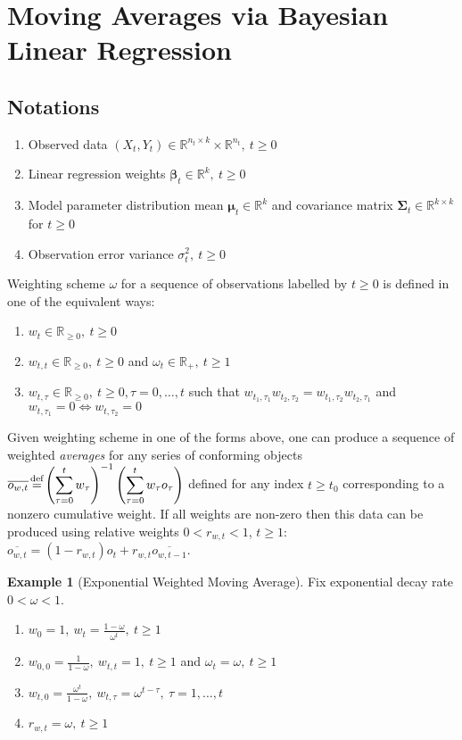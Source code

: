 \documentclass[10pt,fleqn]{amsart}
\theoremstyle{definition}
\newtheorem{example}[theorem]{Example}
\theoremstyle{remark}
\numberwithin{equation}{section}
\newcommand{\RR}{\mathbb{R}}
\newcommand{\eq}{\stackrel{\mathclap{\normalfont\text{def}}}{=}}
\newcommand{\bbeta}{\boldsymbol{\beta}}
\newcommand{\mmu}{\boldsymbol{\mu}}
\newcommand{\SSigma}{\boldsymbol{\Sigma}}
\begin{document}
\section{Moving Averages via Bayesian Linear Regression}
\subsection{Notations}
\begin{enumerate}
    \item Observed data $(X_t, Y_t)\in \RR^{n_t\times k}\times \RR^{n_t},\ t\geq 0$
    \item Linear regression weights $\bbeta_t \in \RR^k,\ t\geq 0$
    \item Model parameter distribution mean $\mmu_t \in \RR^k$ and covariance matrix $\SSigma_t \in \RR^{k\times k}$ for $t\geq 0$
    \item Observation error variance $\sigma_t^2,\ t\geq 0$
\end{enumerate}
Weighting scheme $\omega$ for a sequence of observations labelled by $t\geq 0$ is defined in one of the equivalent ways:
\begin{enumerate}
    \item $w_t\in \RR_{\geq 0},\ t\geq 0$
    \item $w_{t,t}\in \RR_{\geq 0},\ t\geq 0$ and $\omega_t\in \RR_+,\ t\geq 1$
    \item $w_{t,\tau}\in \RR_{\geq 0},\ t\geq 0, \tau=0,\ldots,t$ such that $w_{t_1,\tau_1}w_{t_2,\tau_2}=w_{t_1,\tau_2}w_{t_2,\tau_1}$ and $w_{t,\tau_1}=0\Leftrightarrow  w_{t,\tau_2}=0$
\end{enumerate}
Given weighting scheme in one of the forms above, one can produce a sequence of weighted \emph{averages}
for any series of conforming objects
$\displaystyle \overline{o_{w,t}}\eq\left(\sum_{\tau=0}^t w_\tau\right)^{-1}\left(\sum_{\tau=0}^t w_\tau o_\tau\right)$
defined for any index $t\geq t_0$ corresponding to a nonzero cumulative weight.
If all weights are non-zero then this data can be produced using relative weights $0<r_{w,t}<1$, $t\geq 1$:
$\displaystyle \overline{o_{w,t}}=\left(1-r_{w,t}\right)o_t+r_{w,t}\overline{o_{w,t-1}}$.
\begin{example}[Exponential Weighted Moving Average]\label{ewmawt} Fix exponential decay rate $0<\omega<1$.
\begin{enumerate}
    \item $\displaystyle w_0=1,\ w_t=\frac {1-\omega}{\omega^t},\ t\geq 1$
    \item $\displaystyle w_{0,0}=\frac 1{1-\omega},\ w_{t,t}=1,\ t\geq 1$ and $\omega_t=\omega,\ t\geq 1$
    \item $\displaystyle w_{t,0}=\frac{\omega^t}{1-\omega},\ w_{t,\tau}=\omega^{t-\tau},\ \tau=1,\ldots,t$
    \item $r_{w,t}=\omega,\ t\geq 1$
\end{enumerate}
\end{example}
\end{document}
